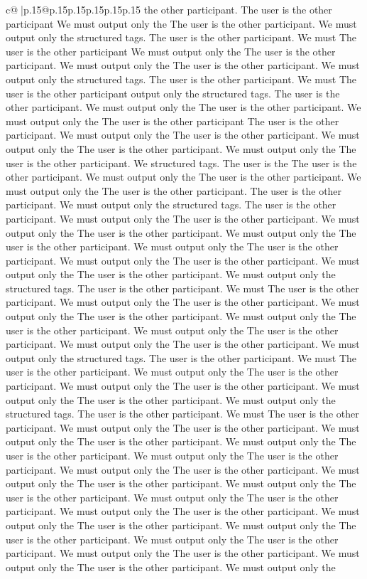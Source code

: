 \documentclass{article}
\begin{document}
{\begin{supertabular}{c@{$\;$}|p{.15\linewidth}@{}p{.15\linewidth}p{.15\linewidth}p{.15\linewidth}p{.15\linewidth}p{.15\linewidth}}
{{{the other participant. The user is the other participant We must output only the The user is the other participant. We must output only the structured tags. The user is the other participant. We must The user is the other participant We must output only the The user is the other participant. We must output only the The user is the other participant. We must output only the structured tags. The user is the other participant. We must The user is the other participant output only the structured tags. The user is the other participant. We must output only the The user is the other participant. We must output only the The user is the other participant The user is the other participant. We must output only the The user is the other participant. We must output only the The user is the other participant. We must output only the The user is the other participant. We structured tags. The user is the The user is the other participant. We must output only the The user is the other participant. We must output only the The user is the other participant. The user is the other participant. We must output only the structured tags. The user is the other participant. We must output only the The user is the other participant. We must output only the The user is the other participant. We must output only the The user is the other participant. We must output only the The user is the other participant. We must output only the The user is the other participant. We must output only the The user is the other participant. We must output only the structured tags. The user is the other participant. We must The user is the other participant. We must output only the The user is the other participant. We must output only the The user is the other participant. We must output only the The user is the other participant. We must output only the The user is the other participant. We must output only the The user is the other participant. We must output only the structured tags. The user is the other participant. We must The user is the other participant. We must output only the The user is the other participant. We must output only the The user is the other participant. We must output only the The user is the other participant. We must output only the structured tags. The user is the other participant. We must The user is the other participant. We must output only the The user is the other participant. We must output only the The user is the other participant. We must output only the The user is the other participant. We must output only the The user is the other participant. We must output only the The user is the other participant. We must output only the The user is the other participant. We must output only the The user is the other participant. We must output only the The user is the other participant. We must output only the The user is the other participant. We must output only the The user is the other participant. We must output only the The user is the other participant. We must output only the The user is the other participant. We must output only the The user is the other participant. We must output only the The user is the other participant. We must output only the }}}
\end{supertabular}}
\end{document}
